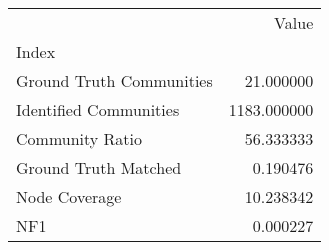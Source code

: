 \begin{tabular}{lr}
\toprule
{} &        Value \\
Index                    &              \\
\midrule
Ground Truth Communities &    21.000000 \\
Identified Communities   &  1183.000000 \\
Community Ratio          &    56.333333 \\
Ground Truth Matched     &     0.190476 \\
Node Coverage            &    10.238342 \\
NF1                      &     0.000227 \\
\bottomrule
\end{tabular}
